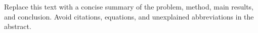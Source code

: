 Replace this text with a concise summary of the problem, method, main results,
and conclusion. Avoid citations, equations, and unexplained abbreviations in
the abstract.